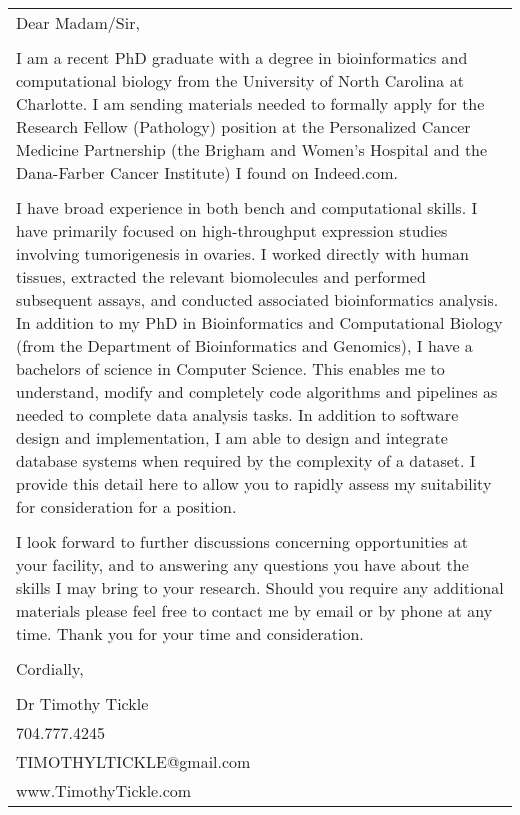 \documentclass[12pt]{report}
\def\fullLength{6.5in}
\begin{document}
\pagestyle{fancy}
\fancyhead{}

\begin{table}[!h]
\begin{tabular}{p{\fullLength}}
Dear Madam/Sir,\\
\\
I am a recent PhD graduate with a degree in bioinformatics and computational biology from the University of North Carolina at Charlotte. I am sending materials needed to formally apply for the Research Fellow (Pathology) position at the Personalized Cancer Medicine Partnership (the Brigham and Women's Hospital and the Dana-Farber Cancer Institute) I found on Indeed.com.\\
\\
I have broad experience in both bench and computational skills. I have primarily focused on high-throughput expression studies involving tumorigenesis in ovaries. I worked directly with human tissues, extracted the relevant biomolecules and performed subsequent assays, and conducted associated bioinformatics analysis. In addition to my PhD in Bioinformatics and Computational Biology (from the Department of Bioinformatics and Genomics), I have a bachelors of science in Computer Science. This enables me to understand, modify and completely code algorithms and pipelines as needed to complete data analysis tasks. In addition to software design and implementation, I am able to design and integrate database systems when required by the complexity of a dataset. I provide this detail here to allow you to rapidly assess my suitability for consideration for a position.\\
\\
I look forward to further discussions concerning opportunities at your facility, and to answering any questions you have about the skills I may bring to your research. Should you require any additional materials please feel free to contact me by email or by phone at any time. Thank you for your time and consideration.\\
\\
Cordially,\\
\\
Dr Timothy Tickle\\
704.777.4245\\
TIMOTHYLTICKLE@gmail.com\\
www.TimothyTickle.com\\
\end{tabular}
\end{table}
\end{document}
